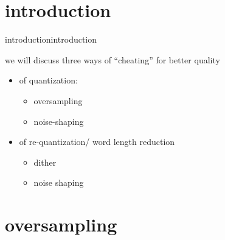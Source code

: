 



\subtitle{Part 14: Improving (Re-)Quantization Quality}


	

\section[intro]{introduction}
	\begin{frame}{introduction}{introduction}
        
        \bigskip
        we will discuss three ways of ``cheating'' for better quality
        \begin{itemize}
            \item   of quantization:
                \begin{itemize}
                    \item   oversampling
                    \item   noise-shaping
                \end{itemize}
            \smallskip
            \item   of re-quantization/ word length reduction
                \begin{itemize}
                    \item   dither
                    \item   noise shaping
                \end{itemize}
        \end{itemize}
    \end{frame}
\section{oversampling}

